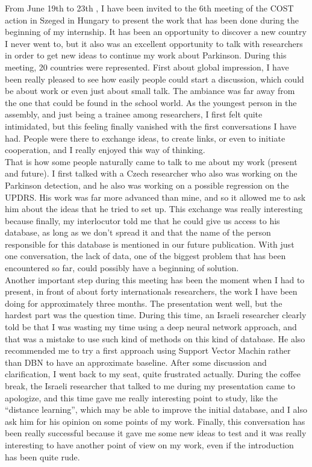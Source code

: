 \documentclass{report}
\begin{document}
		From June 19th to 23th   , I have been invited to the 6th meeting of the COST action in Szeged in Hungary to present the work that has been done during the beginning of my internship. It has been an opportunity to discover a new country I never went to, but it also was an excellent opportunity to talk with researchers in order to get new ideas to continue my work about Parkinson. During this meeting, 20 countries were represented.
		First about global impression, I have been really pleased to see how easily people could start a discussion, which could be about work or even just about small talk. The ambiance was far away from the one that could be found in the school world. As the youngest person in the assembly, and just being a trainee among researchers, I first felt quite intimidated, but this feeling finally vanished with the first conversations I have had. People were there to exchange ideas, to create links, or even to initiate cooperation, and I really enjoyed this way of thinking.\\
		
		That is how some people naturally came to talk to me about my work (present and future). I first talked with a Czech researcher who also was working on the Parkinson detection, and he also was working on a possible regression on the UPDRS. His work was far more advanced than mine, and so it allowed me to ask him about the ideas that he tried to set up. This exchange was really interesting because finally, my interlocutor told me that he could give us access to his database, as long as we don't spread it and that the name of the person responsible for this database is mentioned in our future publication. With just one conversation, the lack of data, one of the biggest problem that has been encountered so far, could possibly have a beginning of solution.\\
		
		Another important step during this meeting has been the moment when I had to present, in front of about forty internationals researchers, the work I have been doing for approximately three months. The presentation went well, but the hardest part was the question time. During this time, an Israeli researcher clearly told be that I was wasting my time using a deep neural network approach, and that was a mistake to use such kind of methods on this kind of database. He also recommended me to try a first approach using Support Vector Machin rather than DBN to have an approximate baseline. After some discussion and clarification, I went back to my seat, quite frustrated actually. During the coffee break, the Israeli researcher that talked to me during my presentation came to apologize, and this time gave me really interesting point to study, like the “distance learning”, which may be able to improve the initial database, and I also ask him for his opinion on some points  of my work. Finally, this conversation has been really successful because it gave me some new ideas to test and it was really interesting to have another point of view on my work, even if the introduction has been quite rude.\\
		
\end{document}
